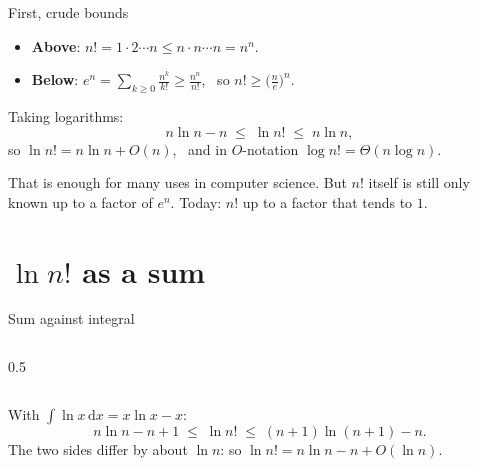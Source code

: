 \documentclass[10pt]{wosm-slides}
\newcommand{\dx}{\,\mathrm{d}x}
\begin{document}
\begin{frame}{First, crude bounds}
  \begin{itemize}
    \item \textbf{Above}: $n! = 1 \cdot 2 \cdots n \le n \cdot n \cdots n = n^n$.
    \item \textbf{Below}: $e^n = \sum_{k \ge 0} \frac{n^k}{k!} \ge \frac{n^n}{n!}$, \ so
      $n! \ge \bigl(\frac{n}{e}\bigr)^n$.
  \end{itemize}
  \pause
  Taking logarithms:
  \[ n \ln n - n \;\le\; \ln n! \;\le\; n \ln n , \]
  so $\ln n! = n \ln n + O(n)$, \ and in $O$-notation $\log n! = \Theta(n \log n)$.
  \pause
  \begin{remark}
    That is enough for many uses in computer science. But $n!$ itself is still only known up to a
    factor of $e^n$. Today: $n!$ up to a factor that tends to $1$.
  \end{remark}
\end{frame}

\section{$\ln n!$ as a sum}

\begin{frame}{Sum against integral}
  \begin{columns}[c]
    \begin{column}{0.5\textwidth}
    \end{column}
  \end{columns}
  \pause
  With $\int \ln x \dx = x \ln x - x$:
  \[ n \ln n - n + 1 \;\le\; \ln n! \;\le\; (n+1)\ln(n+1) - n . \]
  The two sides differ by about $\ln n$: so $\ln n! = n \ln n - n + O(\ln n)$.
\end{frame}
\end{document}
